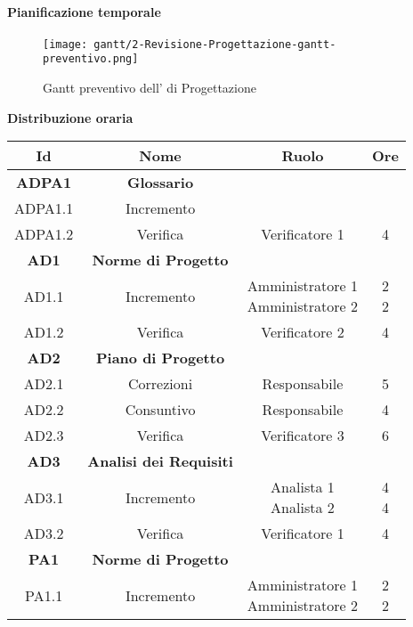 \documentclass{scalatekids-article}
\begin{document}
\newpage
\paragraph{Pianificazione temporale}
\begin{figure}[H]
  \texttt{[image: gantt/2-Revisione-Progettazione-gantt-preventivo.png]}
  \caption*{Gantt preventivo dell' di Progettazione}
\end{figure}

\newpage
\textbf{Distribuzione oraria}
\scriptsize
\begin{center}
  \begin{tabular}{| c | c | c | c |}
    \hline
    \textbf{Id} & \textbf{Nome} & \textbf{Ruolo} & \textbf{Ore}\\
    \hline
    \textbf{ADPA1} & \textbf{Glossario} & &\\
    \hline
    ADPA1.1 & Incremento &  &\\
    \hline
    ADPA1.2 & Verifica & Verificatore 1 & 4\\
    \hline
    \textbf{AD1} & \textbf{Norme di Progetto} & &\\
    \hline
    AD1.1 & Incremento & \multiLineCell[t]{Amministratore 1\\Amministratore 2} & \multiLineCell[t]{2\\2}\\
    \hline
    AD1.2 & Verifica & Verificatore 2 & 4\\
    \hline
    \textbf{AD2} & \textbf{Piano di Progetto} & &\\
    \hline
    AD2.1 & Correzioni & Responsabile & 5\\
    \hline
    AD2.2 & Consuntivo & Responsabile & 4\\
    \hline
    AD2.3 & Verifica & Verificatore 3 & 6\\
    \hline
    \textbf{AD3} & \textbf{Analisi dei Requisiti} & &\\
    \hline
    AD3.1 & Incremento & \multiLineCell[t]{Analista 1\\Analista 2} & \multiLineCell[t]{4\\4}\\
    \hline
    AD3.2 & Verifica & Verificatore 1 & 4\\
    \hline
    \textbf{PA1} & \textbf{Norme di Progetto} & &\\
    \hline
    PA1.1 & Incremento & \multiLineCell[t]{Amministratore 1\\Amministratore 2} & \multiLineCell[t]{2\\2}\\

\end{tabular}
\end{center}
\end{document}
